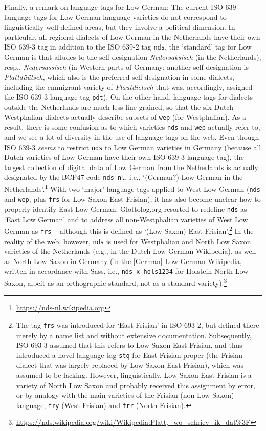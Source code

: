 \documentclass[11pt]{article}
\newcommand{\word}[1]{\textsl{#1}} %
\newcommand{\code}[1]{\texttt{#1}} %
\begin{document}
Finally, a remark on language tags for Low German: 
The current ISO 639 language tags for Low German language varieties do not correspond to linguistically well-defined areas, but they involve a political dimension.
In particular, all regional dialects of Low German in the Netherlands have their own ISO 639-3 tag in addition to the ISO 639-2 tag \code{nds}, the `standard' tag for Low German is that alludes to the self-designation \word{Nedersaksisch} (in the Netherlands), resp., \word{Nedersassisch} (in Western parts of Germany; another self-designation is \word{Plattdüütsch}, which also is the preferred self-designation in some dialects, including the emmigrant variety of \word{Plautdietsch} that was, accordingly, assigned the ISO 639-3 language tag \code{pdt}). On the other hand, language tags for dialects outside the Netherlands are much less fine-grained, so that the six Dutch Westphalian dialects actually describe subsets of \code{wep} (for Westphalian). As a result, there is some confusion as to which varieties \code{nds} and \code{wep} actually refer to, and we see a lot of diversity in the use of language tags on the web. Even though ISO 639-3 \emph{seems} to restrict \code{nds} to Low German varieties in Germany (because all Dutch varieties of Low German have their own ISO 639-3 language tag), the largest collection of digital data of Low German from the Netherlands is actually designated by the BCP47 code \code{nds-nl}, i.e., `(German?) Low German in the Netherlands'.\footnote{\url{https://nds-nl.wikipedia.org}} 
With two `major' language tags applied to West Low German (\code{nds} and \code{wep}; plus \code{frs} for Low Saxon East Frisian), it has also become unclear how to properly identify East Low German. Glottolog.org resorted to redefine \code{nds} as `East Low German' and to address all non-Westphalian varieties of West Low German as \code{frs} -- although this is defined as `(Low Saxon) East Frisian'.\footnote{
  The tag \code{frs} was introduced for `East Frisian' in ISO 693-2, but defined there merely by a name list and without extensive documentation. Subsequently, ISO 693-3 assumed that this refers to Low Saxon East Frisian, and thus introduced a novel language tag \code{stq} for East Frisian proper (the Frisian dialect that was largely replaced by Low Saxon East Frisian), which was assumed to be lacking. However, linguistically, Low Saxon East Frisian is a variety of North Low Saxon and probably received this assignment by error, or by analogy with the main varieties of the Frisian (non-Low Saxon) language, \code{fry} (West Frisian) and \code{frr} (North Frisian).
} In the reality of the web, however, \code{nds} is used for Westphalian and North Low Saxon varieties of the Netherlands (e.g., in the Dutch Low German Wikipedia), as well as North Low Saxon in Germany (in the [German] Low German Wikipedia, written in accordance with Sass, i.e., \code{nds-x-hols1234} for Holstein North Low Saxon, albeit as an orthographic standard, not as a standard variety).\footnote{
    \url{https://nds.wikipedia.org/wiki/Wikipedia:Platt,_wo_schriev_ik_dat\%3F}
}
\end{document}
